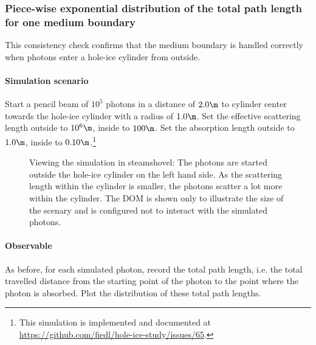 \subsubsection{Piece-wise exponential distribution of the total path length for one medium boundary}


This consistency check confirms that the medium boundary is handled correctly when photons enter a hole-ice cylinder from outside.


%

\paragraph{Simulation scenario} Start a pencil beam of $10^5$ photons in a distance of $2.0\m$ to cylinder center towards the hole-ice cylinder with a radius of $1.0\m$. Set the effective scattering length outside to $10^6\m$, inside to $100\m$. Set the absorption length outside to $1.0\m$, inside to $0.10\m$.\footnote{This simulation is implemented and documented at \url{https://github.com/fiedl/hole-ice-study/issues/65}.}

\begin{figure}
  \caption{Viewing the simulation in steamshovel: The photons are started outside the hole-ice cylinder on the left hand side. As the scattering length within the cylinder is smaller, the photons scatter a lot more within the cylinder. The DOM is shown only to illustrate the size of the scenary and is configured not to interact with the simulated photons.}
\end{figure}

\paragraph{Observable} As before, for each simulated photon, record the total path length, i.e. the total travelled distance from the starting point of the photon to the point where the photon is absorbed. Plot the distribution of these total path lengths.

